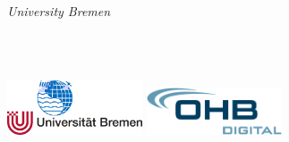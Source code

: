 \begin{titlingpage} %
\thispagestyle{empty} 
\begin{center}
\begin{large}
  \textit{University Bremen}\\
\end{large}
\vspace{4cm} %
\begin{large} 
\textbf{\thetitle} 
\end{large}
\theauthor\\
\thedate\\
\vspace{13cm} %

\includegraphics[width=0.3\textwidth]{img/res/uniLogoIUP.png}
\hspace{4cm}
\includegraphics[width=0.3\textwidth]{img/res/logo_ohb_digital.png}

\end{center}
\end{titlingpage}
